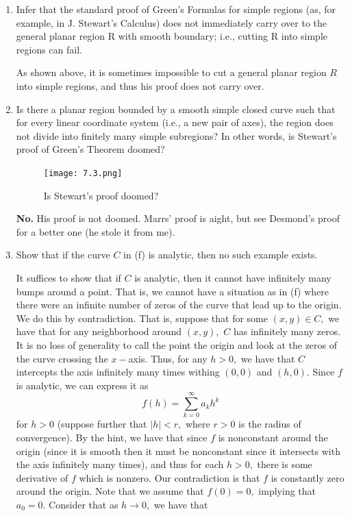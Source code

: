 \documentclass[11pt]{article}
\begin{document}
\begin{enumerate}
\begin{solution}
\end{solution}
\item 
\begin{problem}
     Infer that the standard proof of Green’s Formulas for simple regions (as,
 for example, in J. Stewart’s Calculus) does not immediately carry over to
 the general planar region R with smooth boundary; i.e., cutting R into
 simple regions can fail.
\end{problem}
\begin{solution}
    As shown above, it is sometimes impossible to cut a general planar region $R$ into simple regions, and thus his proof does not carry over.
\end{solution}
\item 
\begin{problem}
    Is there a planar region bounded by a smooth simple closed curve such
 that for every linear coordinate system (i.e., a new pair of axes), the region
 does not divide into finitely many simple subregions? In other words, is
 Stewart’s proof of Green’s Theorem doomed?
\end{problem}
\begin{figure}[h]
        \centering
        \texttt{[image: 7.3.png]}
        \caption{Is Stewart's proof doomed?}
    \end{figure}
\begin{solution}
\textbf{No.} His proof is not doomed. Marrs' proof is aight, but see Desmond's proof for a better one (he stole it from me).
\end{solution}
\item 
\begin{problem}
    Show that if the curve $C$ in (f) is analytic, then no such example exists.
\end{problem}
\begin{solution}
    It suffices to show that if $C$ is analytic, then it cannot have infinitely many bumps around a point. That is, we cannot have a situation as in (f) where there were an infinite number of zeros of the curve that lead up to the origin. We do this by contradiction. That is, suppose that for some $(x,y)\in C,$ we have that for any neighborhood around $(x,y),$ $C$ has infinitely many zeros. It is no loss of generality to call the point the origin and look at the zeros of the curve crossing the $x-$axis. Thus, for any $h>0,$ we have that $C$ intercepts the axis infinitely many times withing $(0,0)$ and $(h,0).$ Since $f$ is analytic, we can express it as 
    \[f(h) = \sum_{k =0}^\infty a_k h^k\] for $h>0$ (suppose further that $|h|< r,$ where $r>0$ is the radius of convergence). By the hint, we have that since $f$ is nonconstant around the origin (since it is smooth then it must be nonconstant since it intersects with the axis infinitely many times), and thus for each $h>0,$ there is some derivative of $f$ which is nonzero. Our contradiction is that $f$ is constantly zero around the origin. Note that we assume that $f(0) = 0,$ implying that $a_0 = 0.$ Consider that as $h\to 0,$ we have that

\end{solution}
\end{enumerate}
\end{document}
